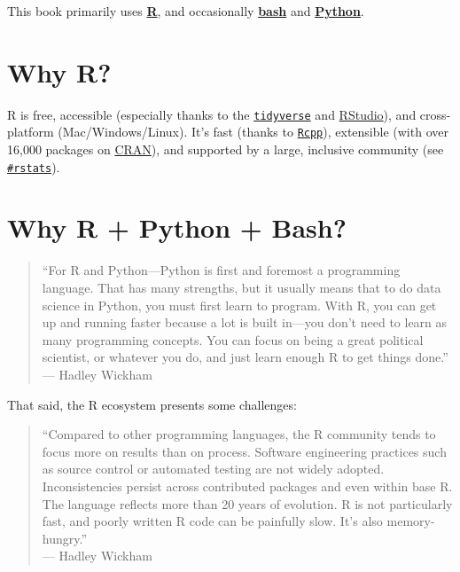 \documentclass[
]{book}
\begin{document}
This book primarily uses \href{https://www.r-project.org/about.html}{\textbf{R}}, and occasionally \href{https://www.gnu.org/software/bash/}{\textbf{bash}} and \href{https://www.python.org/about/}{\textbf{Python}}.

\section{\texorpdfstring{\textbf{Why R?}}{Why R?}}\label{why-r}

R is free, accessible (especially thanks to the \href{https://www.tidyverse.org/}{\texttt{tidyverse}} and \href{https://posit.co}{RStudio}), and cross-platform (Mac/Windows/Linux). It's fast (thanks to \href{https://cran.r-project.org/web/packages/Rcpp/index.html}{\texttt{Rcpp}}), extensible (with over 16,000 packages on \href{https://cran.r-project.org/web/packages/}{CRAN}), and supported by a large, inclusive community (see \href{https://twitter.com/search?q=\%23rstats&src=typed_query}{\texttt{\#rstats}}).

\section{\texorpdfstring{\textbf{Why R + Python + Bash?}}{Why R + Python + Bash?}}\label{why-r-python-bash}

\begin{quote}
``For R and Python---Python is first and foremost a programming language. That has many strengths, but it usually means that to do data science in Python, you must first learn to program. With R, you can get up and running faster because a lot is built in---you don't need to learn as many programming concepts. You can focus on being a great political scientist, or whatever you do, and just learn enough R to get things done.''\\
--- Hadley Wickham
\end{quote}

That said, the R ecosystem presents some challenges:

\begin{quote}
``Compared to other programming languages, the R community tends to focus more on results than on process. Software engineering practices such as source control or automated testing are not widely adopted. Inconsistencies persist across contributed packages and even within base R. The language reflects more than 20 years of evolution. R is not particularly fast, and poorly written R code can be painfully slow. It's also memory-hungry.''\\
--- Hadley Wickham
\end{quote}
\end{document}
